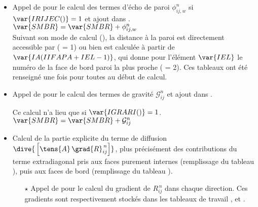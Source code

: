 \begin{itemize}
On effectue une boucle d'indice  sur les cellules $\Omega_l$ de centre $L$ :
\begin{itemize}
\item [$\Rightarrow$] $\displaystyle \var{TRPROD}= \frac{1}{2} (\mathcal{P}^n_{ii})_L = \frac{1}{2} \left[ \var{PRODUC(1,IEL)} +  \var{PRODUC(2,IEL)} +  \var{PRODUC(3,IEL)} \right] $
\item [$\Rightarrow$] $\displaystyle \var{TRRIJ }= \frac{1}{2} (R^n_{ii})_L $
\item [$\Rightarrow$] $\displaystyle \var{SMBR(IEL)} =\ \var{SMBR(IEL)}\ +$\\
$\ \displaystyle\rho^n_L |\Omega_l| \left[ \displaystyle
\frac{2}{3}\,\delta_{\,ij} \left( \ \displaystyle \frac{ C_2}{2}\,(\mathcal{P}^n_{ii})_L\ +
(C_1-1)\ \varepsilon^n_L\, \right)\right.$\\
$ + \left.\ (1-C_2) \ \var{PRODUC(ISOU,IEL)} -
\displaystyle C_1\ \frac{2\,\varepsilon^n_L}{(R^n_{ii})_L}\ (R^n_{ij})_L \right]$
\item [$\Rightarrow$] $\displaystyle \var{ROVSDT(IEL)} = \var{ROVSDT(IEL)} +
\rho^n_L \ |\Omega_l| \ (- \displaystyle \frac{1}{3} \ \,\delta_{\,ij} + 1) \ C_1
\ \frac{2\ \varepsilon^n_L}{(R^n_{ii})_L}$
\end{itemize}
\item Appel de  pour le calcul des termes d'\'echo de paroi
 $\phi^n_{ij,w}$ si $\var{IRIJEC()}=1$ et ajout dans .\\
$\var{SMBR} = \var{SMBR} + \phi^n_{ij,w}$\\
Suivant son mode de calcul (), la distance \`a la paroi est directement accessible
par  ( = 1) ou bien
est calcul\'ee \`a partir de $\var{IA(IIFAPA+IEL - 1)}$,
qui donne pour l'\'el\'ement $\var{IEL}$ le num\'ero de la face de bord
paroi la plus  proche ( = 2). Ces tableaux ont \'et\'e renseign\'e une fois pour toutes au
d\'ebut de calcul.

\item  Appel de  pour le calcul des termes de gravit\'e $\mathcal{G}^n_{ij}$ et ajout dans .

Ce calcul n'a lieu que si $\var{IGRARI()} = 1$.
$ \var{SMBR} = \var{SMBR} + \mathcal{G}^n_{ij}$
\item Calcul de la partie explicite du terme de diffusion
 $\dive{\,\left[\tens{A}\,\grad{R}^{\,n}_{ij}\right]}$, plus pr\'ecis\'ement
des contributions du terme extradiagonal pris aux faces purement internes
(remplissage du tableau ), puis aux faces de bord (remplissage du
tableau ).
\begin{itemize}
\item [$\star$] Appel de  pour le calcul du gradient de
$R^{\,n}_{ij}$ dans chaque direction. Ces gradients sont respectivement
stock\'es dans les tableaux de travail ,  et .


\end{itemize}
\end{itemize}

